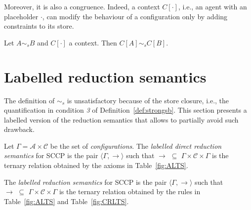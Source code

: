 \documentclass{llncs}
\def\C{{\mathcal C}}
\newcommand{\rarrow}{\rightarrow}
\def\C{{\mathcal C}}
\begin{document}
Moreover, it is also a congruence. Indeed, a context $C[\cdot]$, i.e., an agent with an placeholder $\cdot$,
can modify the behaviour of a configuration only by adding constraints to its store. 

\begin{proposition}
\label{cong1}
Let $A \sim_{\mathit{s}} B$ and $C[\cdot]$ a context.
Then $C[A] \sim_{\mathit{s}} C[B]$.
\end{proposition}



\section{Labelled reduction semantics}\label{sec:labelled}
The definition of $\sim_{\mathit{s}}$ 
is unsatisfactory
because of the store closure, i.e., the quantification in condition \emph{3} of 
Definition~\ref{def:strongsb}.
This section presents a labelled version of the reduction semantics that 
allows to partially 
avoid such drawback.

\begin{definition}
	Let $\Gamma = {\mathcal A} \times \C$ be the set of \emph{configurations}.
	The  \emph{labelled direct reduction semantics} for SCCP is the pair 
	$\langle \Gamma,   \xrightarrow{ }  \rangle$
	such that $\to \, \, \subseteq \, \,\Gamma \times \mathcal{C} \times \Gamma$ is the ternary
	relation obtained by the axioms in Table~\ref{fig:ALTS}.
	
	The \emph{labelled reduction semantics} for SCCP is the pair 
	$\langle \Gamma,  \rightarrow \rangle$
	such that $\rarrow \, \, \subseteq \, \,\Gamma \times \mathcal{C} \times  \Gamma$ is the ternary relation
         obtained by the rules in Table~\ref{fig:ALTS} and Table~\ref{fig:CRLTS}.
\end{definition}
\end{document}
